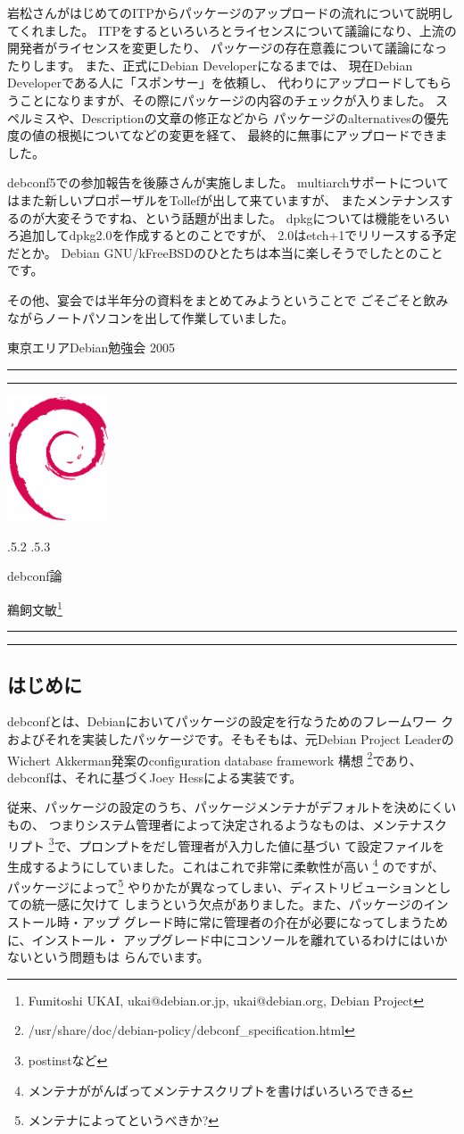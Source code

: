 \documentclass[mingoth,a4paper]{jsarticle}
\makeatletter
\renewcommand{\section}{\@startsection{section}{1}{\z@}%
    {\Cvs \@plus.5\Cdp \@minus.2\Cdp}%
    {.5\Cvs \@plus.3\Cdp}%
    {\normalfont\Large\headfont\raggedright\centering}} %
\newcommand{\dancersection}[2]{%
\newpage
東京エリアDebian勉強会 2005
\hrule
\vspace{0.5mm}
\hrule
\hfill{}\includegraphics[width=3cm]{image200502/openlogo-nd.eps}\\
\vspace{-4cm}
\begin{center}
  \section{#1}
\end{center}
\hfill{}#2\hspace{3cm}\space\\
\hrule
\hrule
\vspace{1cm}
}
\makeatother
\begin{document}
	    岩松さんがはじめてのITPからパッケージのアップロードの流れについて説明してくれました。
	    ITPをするといろいろとライセンスについて議論になり、上流の開発者がライセンスを変更したり、
	    パッケージの存在意義について議論になったりします。
	    また、正式にDebian Developerになるまでは、
	    現在Debian Developerである人に「スポンサー」を依頼し、
	    代わりにアップロードしてもらうことになりますが、その際にパッケージの内容のチェックが入りました。
	    スペルミスや、Descriptionの文章の修正などから
	    パッケージのalternativesの優先度の値の根拠についてなどの変更を経て、
	    最終的に無事にアップロードできました。

	    debconf5での参加報告を後藤さんが実施しました。
	    multiarchサポートについてはまた新しいプロポーザルをTollefが出して来ていますが、
	    またメンテナンスするのが大変そうですね、という話題が出ました。
	    dpkgについては機能をいろいろ追加してdpkg2.0を作成するとのことですが、
	    2.0はetch+1でリリースする予定だとか。
	    Debian GNU/kFreeBSDのひとたちは本当に楽しそうでしたとのこと
	    です。

その他、宴会では半年分の資料をまとめてみようということで
ごそごそと飲みながらノートパソコンを出して作業していました。


\dancersection{debconf論}{鵜飼文敏\footnote{Fumitoshi UKAI, ukai@debian.or.jp, ukai@debian.org, Debian Project}}
\label{sec:ukai}
\subsection{はじめに}

debconfとは、Debianにおいてパッケージの設定を行なうためのフレームワー
クおよびそれを実装したパッケージです。そもそもは、元Debian Project
LeaderのWichert Akkerman発案のconfiguration database framework 構想
\footnote{/usr/share/doc/debian-policy/debconf\_specification.html}であり、
debconfは、それに基づくJoey Hessによる実装です。

従来、パッケージの設定のうち、パッケージメンテナがデフォルトを決めにくいもの、
つまりシステム管理者によって決定されるようなものは、メンテナスクリプト
\footnote{postinstなど}で、プロンプトをだし管理者が入力した値に基づい
て設定ファイルを生成するようにしていました。これはこれで非常に柔軟性が高い
\footnote{メンテナががんばってメンテナスクリプトを書けばいろいろできる} 
のですが、パッケージによって\footnote{メンテナによってというべきか?} 
やりかたが異なってしまい、ディストリビューションとしての統一感に欠けて
しまうという欠点がありました。また、パッケージのインストール時・アップ
グレード時に常に管理者の介在が必要になってしまうために、インストール・
アップグレード中にコンソールを離れているわけにはいかないという問題もは
らんでいます。
\end{document}
